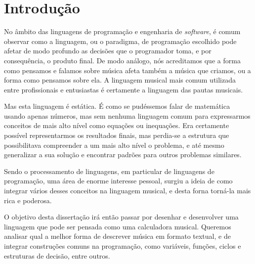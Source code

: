\newcommand{\novathesis}{\emph{novathesis}}
\newcommand{\novathesisclass}{\texttt{novathesis.cls}}


\chapter{Introdução}
\label{cha:introducao}


No âmbito das linguagens de programação e engenharia de \textit{software}, é comum observar como a linguagem, ou o paradigma, de programação escolhido pode afetar de modo profundo as decisões que o programador toma, e por consequência, o produto final. De modo análogo, nós acreditamos que a forma como pensamos e falamos sobre música afeta também a música que criamos, ou a forma como pensamos sobre ela. A linguagem musical mais comum utilizada entre profissionais e entusiastas é certamente a linguagem das pautas musicais.

Mas esta linguagem é estática. É como se pudéssemos falar de matemática usando apenas números, mas sem nenhuma linguagem comum para expressarmos conceitos de mais alto nível como equações ou inequações. Era certamente possível representarmos os resultados finais, mas perdia-se a estrutura que possibilitava compreender a um mais alto nível o problema, e até mesmo generalizar a sua solução e encontrar padrões para outros problemas similares.

Sendo o processamento de linguagens, em particular de linguagens de programação, uma área de enorme interesse pessoal, surgiu a ideia de como integrar vários desses conceitos na linguagem musical, e desta forna torná-la mais rica e poderosa.

O objetivo desta dissertação irá então passar por desenhar e desenvolver uma linguagem que pode ser pensada como uma calculadora musical. Queremos analisar qual a melhor forma de descrever música em formato textual, e de integrar construções comuns na programação, como variáveis, funções, ciclos e estruturas de decisão, entre outros.

